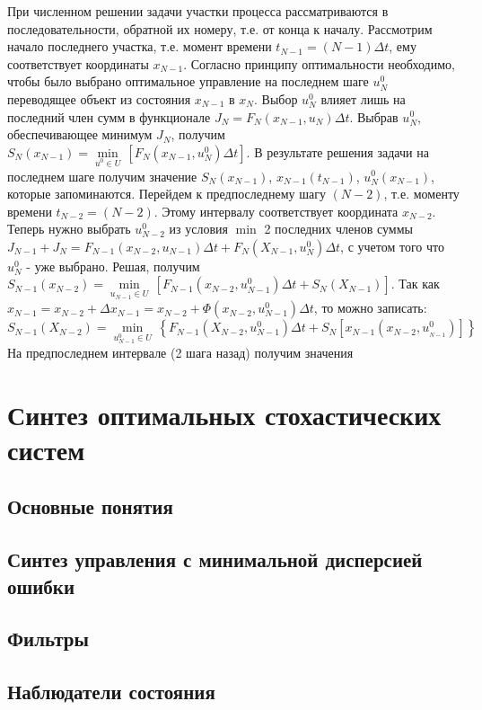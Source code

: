 \documentclass[preprint,russian,a5paper,10pt,twoside,mediummath]{ncc}
\begin{document}
\par При численном решении задачи участки процесса рассматриваются в последовательности, обратной их номеру, т.е. от конца к началу. Рассмотрим начало последнего участка, т.е. момент времени ${{t}_{N-1}}=\left( N-1 \right)\Delta t$, ему соответствует координаты ${{x}_{N-1}}$. Согласно принципу оптимальности необходимо, чтобы было выбрано оптимальное управление на последнем шаге $u_{N}^{0}$ переводящее объект из состояния ${{x}_{N-1}}$ в ${{x}_{N}}$. Выбор $u_{N}^{0}$ влияет лишь на последний член сумм в функционале ${{J}_{N}}={{F}_{N}}\left( {{x}_{N-1}},{{u}_{N}} \right)\Delta t$. Выбрав $u_{N}^{0}$, обеспечивающее минимум ${{J}_{N}}$, получим ${{S}_{N}}\left( {{x}_{N-1}} \right)=\underset{{{u}^{0}}\in U}{\mathop{\min }}\,\left[ {{F}_{N}}\left( {{x}_{N-1}},u_{N}^{0} \right)\Delta t \right]$. В результате решения задачи на последнем шаге получим значение ${{S}_{N}}\left( {{x}_{N-1}} \right)$, ${{x}_{N-1}}\left( {{t}_{N-1}} \right)$, $u_{N}^{0}\left( {{x}_{N-1}} \right)$, которые запоминаются. Перейдем к предпоследнему шагу $\left( N-2 \right)$, т.е. моменту времени ${{t}_{N-2}}=\left( N-2 \right)$. Этому интервалу соответствует координата ${{x}_{N-2}}$. Теперь нужно выбрать $u_{N-2}^{0}$ из условия $\min $ 2 последних членов суммы
\\${{J}_{N-1}}+{{J}_{N}}={{F}_{N-1}}\left( {{x}_{N-2}},{{u}_{N-1}} \right)\Delta t+{{F}_{N}}\left( {{X}_{N-1}},u_{N}^{0} \right)\Delta t$, с учетом того что $u_{N}^{0}$ - уже выбрано. Решая, получим 
${{S}_{N-1}}\left( {{x}_{N-2}} \right)=\underset{{{u}_{N-1}}\in U}{\mathop{\min }}\,\left[ {{F}_{N-1}}\left( {{x}_{N-2}},u_{N-1}^{0} \right)\Delta t+{{S}_{N}}\left( {{X}_{N-1}} \right) \right]$. Так как ${{x}_{N-1}}={{x}_{N-2}}+\Delta {{x}_{N-1}}={{x}_{N-2}}+\Phi \left( {{x}_{N-2}},u_{N-1}^{0} \right)\Delta t$, то можно записать: 
\\${{S}_{N-1}}\left( {{X}_{N-2}} \right)=\underset{u_{N-1}^{0}\in U}{\mathop{\min }}\,\left\{ {{F}_{N-1}}\left( {{X}_{N-2}},u_{N-1}^{0} \right)\Delta t+{{S}_{N}}\left[ {{x}_{N-1}}\left( {{x}_{N-2}},u_{_{N-1}}^{0} \right) \right] \right\}$ 
\\На предпоследнем интервале (2 шага назад) получим значения
\clearpage
\section{Синтез оптимальных стохастических систем\label{stochastic}}
 \subsection{Основные понятия\label{stochastic:general}}
 
 \subsection{Синтез управления с минимальной дисперсией ошибки\label{stochastic:min_error_dispersion}}
 
 \subsection{Фильтры\label{stochastic:filters}}
 
 \subsection{Наблюдатели состояния\label{stochastic:observers}}
\end{document}
